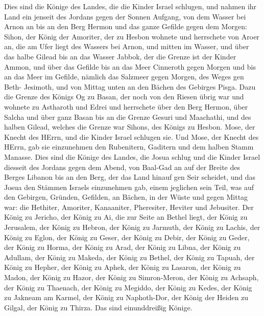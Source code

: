  Dies sind die Könige des Landes, die die Kinder Israel
schlugen, und nahmen ihr Land ein jenseit des Jordans gegen der Sonnen
Aufgang, von dem Wasser bei Arnon an bis an den Berg Hermon und das
ganze Gefilde gegen dem Morgen:  Sihon, der König der
Amoriter, der zu Hesbon wohnete und herrschete von Aroer an, die am Ufer
liegt des Wassers bei Arnon, und mitten im Wasser, und über das halbe
Gilead bis an das Wasser Jabbok, der die Grenze ist der Kinder Ammon,
 und über das Gefilde bis an das Meer Cinneroth gegen Morgen
und bis an das Meer im Gefilde, nämlich das Salzmeer gegen Morgen, des
Weges gen Beth- Jesimoth, und von Mittag unten an den Bächen des
Gebirges Pisga.  Dazu die Grenze des Königs Og zu Basan, der
noch von den Riesen übrig war und wohnete zu Astharoth und Edrei
 und herrschete über den Berg Hermon, über Salcha und über
ganz Basan bis an die Grenze Gesuri und Maachathi, und des halben
Gilead, welches die Grenze war Sihons, des Königs zu Hesbon.
 Mose, der Knecht des HErrn, und die Kinder Israel schlugen
sie. Und Mose, der Knecht des HErrn, gab sie einzunehmen den Rubenitern,
Gaditern und dem halben Stamm Manasse.  Dies sind die Könige
des Landes, die Josua schlug und die Kinder Israel diesseit des Jordans
gegen dem Abend, von Baal-Gad an auf der Breite des Berges Libanon bis
an den Berg, der das Land hinauf gen Seir scheidet, und das Josua den
Stämmen Israels einzunehmen gab, einem jeglichen sein Teil, 
was auf den Gebirgen, Gründen, Gefilden, an Bächen, in der Wüste und
gegen Mittag war: die Hethiter, Amoriter, Kanaaniter, Pheresiter,
Heviter und Jebusiter.  Der König zu Jericho, der König zu
Ai, die zur Seite an Bethel liegt,  der König zu Jerusalem,
der König zu Hebron,  der König zu Jarmuth, der König zu
Lachis,  der König zu Eglon, der König zu Geser,
 der König zu Debir, der König zu Geder,  der
König zu Horma, der König zu Arad,  der König zu Libna, der
König zu Adullam,  der König zu Makeda, der König zu
Bethel,  der König zu Tapuah, der König zu Hepher,
 der König zu Aphek, der König zu Lasaron, 
der König zu Madon, der König zu Hazor,  der König zu
Simron-Meron, der König zu Achsaph,  der König zu Thaenach,
der König zu Megiddo,  der König zu Kedes, der König zu
Jakneam am Karmel,  der König zu Naphoth-Dor, der König der
Heiden zu Gilgal,  der König zu Thirza. Das sind
einunddreißig Könige.

